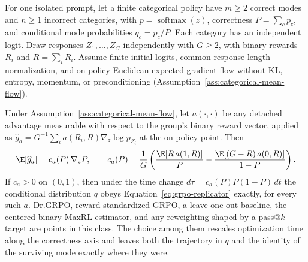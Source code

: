 For one isolated prompt, let a finite categorical policy have $m\ge2$ correct modes and $n\ge1$ incorrect categories, with $p=\operatorname{softmax}(z)$, correctness $P=\sum_c p_c$, and conditional mode probabilities $q_c=p_c/P$. Each category has an independent logit. Draw responses $Z_1,\ldots,Z_G$ independently with $G\ge2$, with binary rewards $R_i$ and $R=\sum_iR_i$. Assume finite initial logits, common response-length normalization, and on-policy Euclidean expected-gradient flow without KL, entropy, momentum, or preconditioning (Assumption~\ref{ass:categorical-mean-flow}).

\begin{theorem}
\label{thm:objective-inertness}
Under Assumption~\ref{ass:categorical-mean-flow}, let $a(\cdot,\cdot)$ be any
detached advantage measurable with respect to the group's binary reward
vector, applied as
$\widehat g_a=G^{-1}\sum_{i}a(R_i,R)\nabla_z\log p_{Z_i}$ at the on-policy
point. Then
\begin{equation}
  \E[\widehat g_a]=c_a(P)\,\nabla_zP,
  \qquad
  c_a(P)=\frac1G\left(
  \frac{\E[R\,a(1,R)]}{P}-\frac{\E[(G-R)\,a(0,R)]}{1-P}\right).
  \label{eq:objective-inertness}
\end{equation}
If $c_a>0$ on $(0,1)$, then under the time change
$d\tau=c_a(P)P(1-P)\,dt$ the conditional distribution $q$ obeys
Equation~\eqref{eq:grpo-replicator} exactly, for every such $a$. Dr.GRPO,
reward-standardized GRPO, a leave-one-out baseline, the centered binary MaxRL
estimator, and any reweighting shaped by a pass@$k$ target are points in this
class. The choice among them rescales optimization time along the correctness
axis and leaves both the trajectory in $q$ and the identity of the surviving
mode exactly where they were.
\end{theorem}
